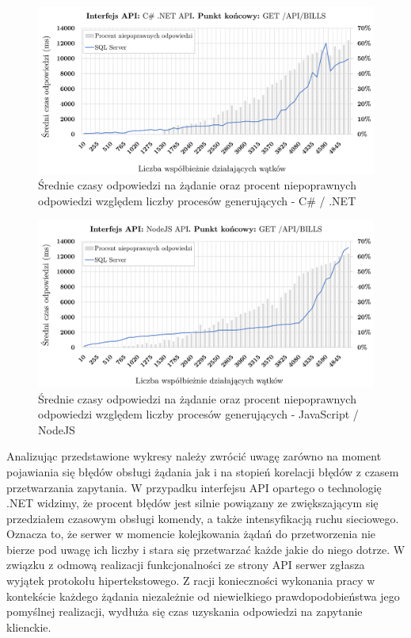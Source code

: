 \begin{figure}[htb]
  \centering
  \includegraphics[width=\textwidth]{rys05/response-and-errors-dotnet.pdf}
    \caption{Średnie czasy odpowiedzi na żądanie oraz procent niepoprawnych odpowiedzi względem liczby procesów generujących - C\# / .NET}
    \label{fig:response-with-errors-dotnet}
  \end{figure}

  \begin{figure}[htb]
    \centering
    \includegraphics[width=\textwidth]{rys05/response-and-errors-nodejs.pdf}
      \caption{Średnie czasy odpowiedzi na żądanie oraz procent niepoprawnych odpowiedzi względem liczby procesów generujących - JavaScript / NodeJS}
      \label{fig:response-with-errors-nodejs}
    \end{figure}

Analizując przedstawione wykresy należy zwrócić uwagę zarówno na moment pojawiania się błędów obsługi żądania jak i na stopień korelacji błędów z czasem przetwarzania zapytania. W przypadku interfejsu API opartego o technologię .NET widzimy, że procent błędów jest silnie powiązany ze zwiększającym się przedziałem czasowym obsługi komendy, a także intensyfikacją ruchu sieciowego. Oznacza to, że serwer w momencie kolejkowania żądań do przetworzenia nie bierze pod uwagę ich liczby i stara się przetwarzać każde jakie do niego dotrze. W związku z odmową realizacji funkcjonalności ze strony API serwer zgłasza wyjątek protokołu hipertekstowego. Z racji konieczności wykonania pracy w kontekście każdego żądania niezależnie od niewielkiego prawdopodobieństwa jego pomyślnej realizacji, wydłuża się czas uzyskania odpowiedzi na zapytanie klienckie.

